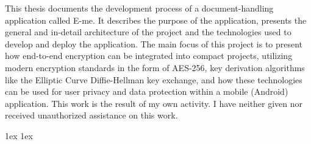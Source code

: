 \documentclass[final,12pt]{ubb_dolgozat}
\author{%
Balázs Márk
}
\begin{document}
\begin{abstractEN} %



{

	\vfill
  
  
	
  This thesis documents the development process of a document-handling application called E-me. It describes the purpose of the application, presents
  the general and in-detail architecture of the project and the technologies used to develop and deploy the application.
  The main focus of this project is to present how end-to-end encryption can be integrated into compact projects, utilizing modern encryption standards
  in the form of AES-256, key derivation algorithms like the Elliptic Curve Diffie-Hellman key exchange, and how these technologies can be used for user
  privacy and data protection within a mobile (Android) application.
	This work is the result of my own activity. I have neither given nor received unauthorized assistance on this work.
  
  
	
	\vfill


}
\vspace*{.5cm}


\end{abstractEN}

\maketitle


{ \baselineskip 1ex
  \parskip 1ex
  \tableofcontents
}













 {
  \renewcommand{\baselinestretch}{0.8}
  \normalsize 
  \setlength{\itemsep}{-2.4mm}
  
  
 }
\end{document}
